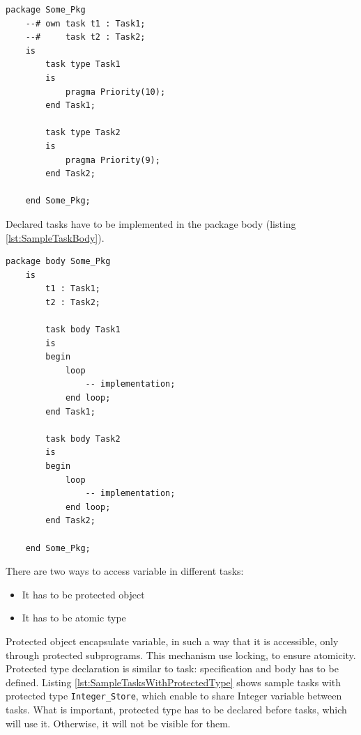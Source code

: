 \singlespacing
\begin{lstlisting}[frame=single, gobble=0, caption={Sample tasks}, label={lst:SampleTask}]
	package Some_Pkg
	--# own task t1 : Task1;
	--#     task t2 : Task2;
	is
		task type Task1
		is
			pragma Priority(10);
		end Task1;

		task type Task2
		is
			pragma Priority(9);
		end Task2;

	end Some_Pkg;
\end{lstlisting} 
\doublespacing

Declared tasks have to be implemented in the package body (listing \ref{lst:SampleTaskBody}).

\singlespacing
\begin{lstlisting}[frame=single, gobble=0, caption={Sample tasks body}, label={lst:SampleTaskBody}]
	package body Some_Pkg
	is
		t1 : Task1;
		t2 : Task2;

		task body Task1
		is
		begin
			loop
				-- implementation;
			end loop;
		end Task1;

		task body Task2
		is
		begin
			loop
				-- implementation;
			end loop;
		end Task2;

	end Some_Pkg;
\end{lstlisting} 
\doublespacing

There are two ways to access variable in different tasks:
\begin{itemize}
    \item It has to be protected object
    \item It has to be atomic type
\end{itemize}


Protected object encapsulate variable, in such a way that it is accessible, only through protected subprograms. This mechanism use locking, to ensure atomicity. Protected type declaration is similar to task: specification and body has to be defined. Listing \ref{lst:SampleTasksWithProtectedType} shows sample tasks with protected type \lstinline{Integer_Store}, which enable to share Integer variable between tasks. What is important, protected type has to be declared before tasks, which will use it. Otherwise, it will not be visible for them.

